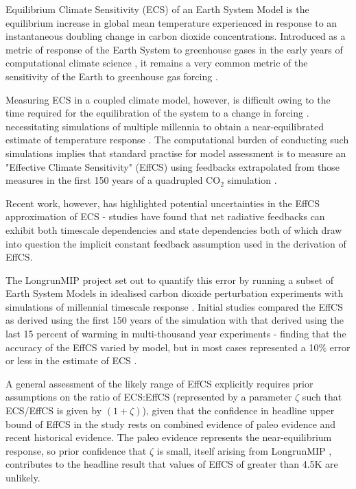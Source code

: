 \documentclass[esd, article]{copernicus}
\begin{document}


\introduction  
Equilibrium Climate Sensitivity (ECS) of an Earth System Model is the equilibrium increase in global mean temperature experienced in response to an instantaneous doubling change in carbon dioxide concentrations.  Introduced as a metric of response of the Earth System to greenhouse gases in the early years of computational climate science \citep{charney1979carbon,hansen1984climate}, it remains a very common metric of the sensitivity of the Earth to greenhouse gas forcing \cite{knutti2017beyond,stocker2013climate}.

Measuring ECS in a coupled climate model, however, is difficult owing to the time required for the equilibration of the system to a change in forcing \cite{wetherald2001committed,solomon2010persistence,jarvis2011contribution}. necessitating simulations of multiple millennia to obtain a near-equilibrated estimate of temperature response \cite{rugenstein2020equilibrium}.  The computational burden of conducting such simulations implies that standard practise for model assessment \citep{stocker2013climate,forster2016inference,andrews2012forcing} is to measure an "Effective Climate Sensitivity" (EffCS) using feedbacks extrapolated from those measures in the first 150 years of a quadrupled CO$_2$ simulation \cite{gregory2004new,murphy1995transient}.

Recent work, however, has highlighted potential uncertainties in the EffCS approximation of ECS - studies have found that net radiative feedbacks can exhibit both timescale dependencies \cite{proistosescu2017slow,andrews2018accounting} and state dependencies \citep{pfister2017state,bloch2021climate} both of which draw into question the implicit constant feedback assumption used in the derivation of EffCS.

The LongrunMIP project set out to quantify this error by running a subset of Earth System Models in idealised carbon dioxide perturbation experiments with simulations of millennial timescale response \citep{rugenstein2019longrunmip}.  Initial studies compared the EffCS as derived using the first 150 years of the simulation with that derived using the last 15 percent of warming in multi-thousand year experiments - finding that the accuracy of the EffCS varied by model, but in most cases represented a 10$\%$ error or less in the estimate of ECS \cite{rugenstein2020equilibrium}.

A general assessment of the likely range of EffCS \citep{sherwood2020assessment} explicitly requires prior assumptions on the ratio of ECS:EffCS (represented by a parameter $\zeta$ such that ECS/EffCS is given by $(1+\zeta)$), given that the confidence in headline upper bound of EffCS in the study rests on combined evidence of paleo evidence and recent historical evidence.  The paleo evidence represents the near-equilibrium response, so prior confidence that $\zeta$ is small, itself arising from LongrunMIP \citep{rugenstein2020equilibrium}, contributes to the headline result that values of EffCS of greater than 4.5K are unlikely.
\end{document}

